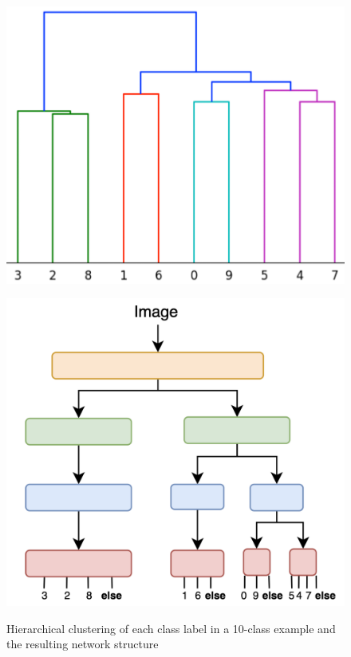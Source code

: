 \begin{figure}
    \centering
    \begin{minipage}[b]{.4\textwidth}
        \centering
        \includegraphics[width=.9\linewidth]{images/hierfig.png}
        \label{fig:sub1}
    \end{minipage}%
    \begin{minipage}[b]{.4\textwidth}
        \centering
        \includegraphics[width=.9\linewidth]{images/example_hier.png}
        \label{fig:sub2}
    \end{minipage}
    \caption{Hierarchical clustering of each class label in a 10-class example and the resulting network structure}
    \label{fig:hierarchy}
\end{figure}

